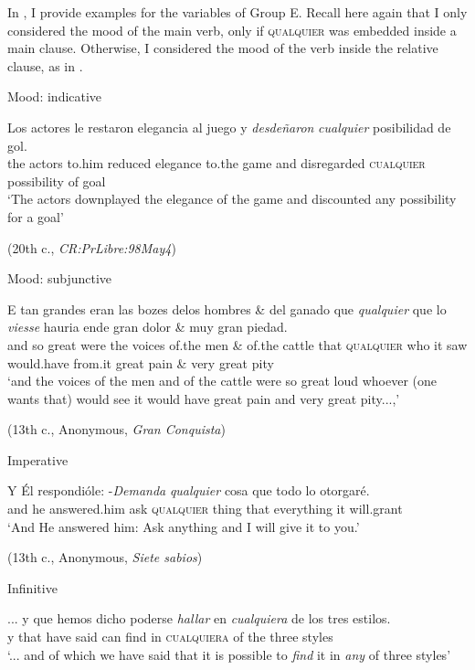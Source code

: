 In , I provide examples for the variables of Group E. Recall here again that I only considered the mood of the main verb, only if \textsc{qualquier} was embedded inside a main clause. Otherwise, I considered the mood of the verb inside the relative clause, as in .

\ea \label{ex:key:277}
\ea \label{ex:key:277-1}  Mood: indicative

    \gll Los actores le restaron elegancia al juego y \textit{desdeñaron} \textit{cualquier} posibilidad de gol.\\
the actors to.him reduced elegance to.the game and disregarded \textsc{cualquier} possibility of goal\\
    \glt ‘The actors downplayed the elegance of the game and discounted any possibility for a goal’

    (20{th} c., \textit{CR:PrLibre:98May4})
    
\ex \label{ex:key:277-2} Mood: subjunctive

    \gll E tan grandes eran las bozes delos hombres \& del ganado que \textit{qualquier} que lo \textit{viesse} hauria ende gran dolor \& muy gran piedad.\\
and so great were the voices of.the men \& of.the cattle that \textsc{qualquier} who it saw would.have from.it great pain \& very great pity\\ 
    \glt ‘and the voices of the men and of the cattle were so great loud whoever (one wants that) would see it would have great pain and very great pity...,’

    (13{th} c., Anonymous, \textit{Gran Conquista})
    
\ex \label{ex:key:277-3} Imperative

    \gll Y Él respondióle: -\textit{Demanda} \textit{qualquier} cosa que todo lo otorgaré.\\
and he answered.him ask \textsc{qualquier} thing that everything it will.grant\\
    \glt ‘And He answered him: Ask anything and I will give it to you.’

    (13th c., Anonymous, \textit{Siete sabios})
    
\ex \label{ex:key:277-4} Infinitive

\gll ... y que hemos dicho poderse \textit{hallar} en \textit{cualquiera} de los tres estilos.\\
{} y that have said can find in \textsc{cualquiera} of the three styles\\
    \glt ‘... and of which we have said that it is possible to \textit{find} it in \textit{any} of three styles’


